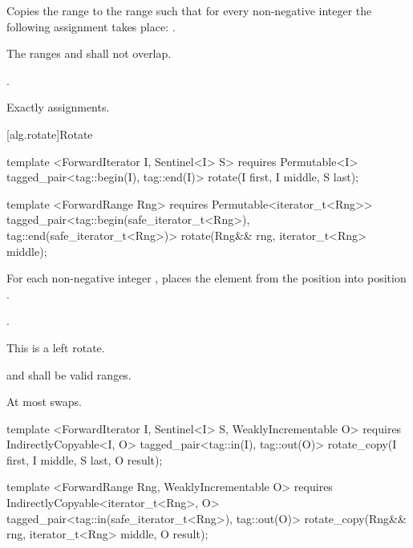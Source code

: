 \begin{itemdescr}
\pnum
\effects
Copies the range
to the range
such that
for every non-negative integer
the following assignment takes place:
.

\pnum
\requires
The ranges
and
shall not overlap.

\pnum
\returns
{}.

\pnum
\complexity
Exactly
assignments.
\end{itemdescr}

[alg.rotate]{Rotate}

%
\begin{itemdecl}
template <ForwardIterator I, Sentinel<I> S>
  requires Permutable<I>
  tagged_pair<tag::begin(I), tag::end(I)> rotate(I first, I middle, S last);

template <ForwardRange Rng>
  requires Permutable<iterator_t<Rng>>
  tagged_pair<tag::begin(safe_iterator_t<Rng>), tag::end(safe_iterator_t<Rng>)>
    rotate(Rng&& rng, iterator_t<Rng> middle);
\end{itemdecl}

\begin{itemdescr}
\pnum
\effects
For each non-negative integer
,
places the element from the position
into position
.

\pnum
\returns {}.

\pnum
\notes
This is a left rotate.

\pnum
\requires
{}
and
shall be valid ranges.

\pnum
\complexity
At most
swaps.
\end{itemdescr}

%
\begin{itemdecl}
template <ForwardIterator I, Sentinel<I> S, WeaklyIncrementable O>
  requires IndirectlyCopyable<I, O>
  tagged_pair<tag::in(I), tag::out(O)>
    rotate_copy(I first, I middle, S last, O result);

template <ForwardRange Rng, WeaklyIncrementable O>
  requires IndirectlyCopyable<iterator_t<Rng>, O>
  tagged_pair<tag::in(safe_iterator_t<Rng>), tag::out(O)>
    rotate_copy(Rng&& rng, iterator_t<Rng> middle, O result);
\end{itemdecl}

